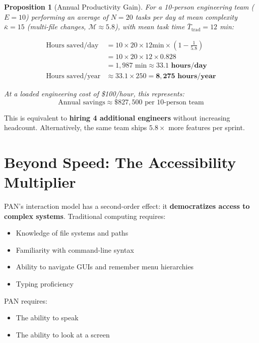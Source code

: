 \documentclass[11pt, a4paper]{article}
\newtheorem{proposition}{Proposition}
\begin{document}
\begin{proposition}[Annual Productivity Gain]
For a 10-person engineering team ($E = 10$) performing an average of $N = 20$
tasks per day at mean complexity $\bar{\kappa} = 15$ (multi-file changes,
$\mathcal{M} \approx 5.8$), with mean task time
$\bar{T}_{\text{trad}} = 12$ min:

\begin{align}
  \text{Hours saved/day} &= 10 \times 20 \times 12\text{min} \times \left(1 - \frac{1}{5.8}\right) \\
  &= 10 \times 20 \times 12 \times 0.828 \\
  &= 1{,}987 \text{ min} \approx \mathbf{33.1 \text{ hours/day}} \\[1em]
  \text{Hours saved/year} &\approx 33.1 \times 250 = \mathbf{8{,}275 \text{ hours/year}}
\end{align}

At a loaded engineering cost of \$100/hour, this represents:
\begin{equation}
  \text{Annual savings} \approx \$827{,}500 \text{ per 10-person team}
\end{equation}
\end{proposition}

This is equivalent to \textbf{hiring 4 additional engineers} without increasing
headcount. Alternatively, the same team ships $5.8\times$ more features per
sprint.

\section{Beyond Speed: The Accessibility Multiplier}

PAN's interaction model has a second-order effect: it \textbf{democratizes
access to complex systems}. Traditional computing requires:

\begin{itemize}[noitemsep]
  \item Knowledge of file systems and paths
  \item Familiarity with command-line syntax
  \item Ability to navigate GUIs and remember menu hierarchies
  \item Typing proficiency
\end{itemize}

PAN requires:
\begin{itemize}[noitemsep]
  \item The ability to speak
  \item The ability to look at a screen
\end{itemize}
\end{document}

